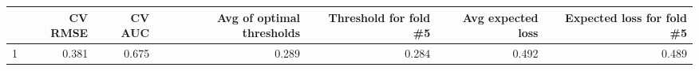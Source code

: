 
\begin{tabular}{lrrrrrr}
\toprule
  & CV RMSE & CV AUC & Avg of optimal thresholds & Threshold for fold \#5 & Avg expected loss & Expected loss for fold \#5\\
\midrule
1 & 0.381 & 0.675 & 0.289 & 0.284 & 0.492 & 0.489\\
\bottomrule
\end{tabular}